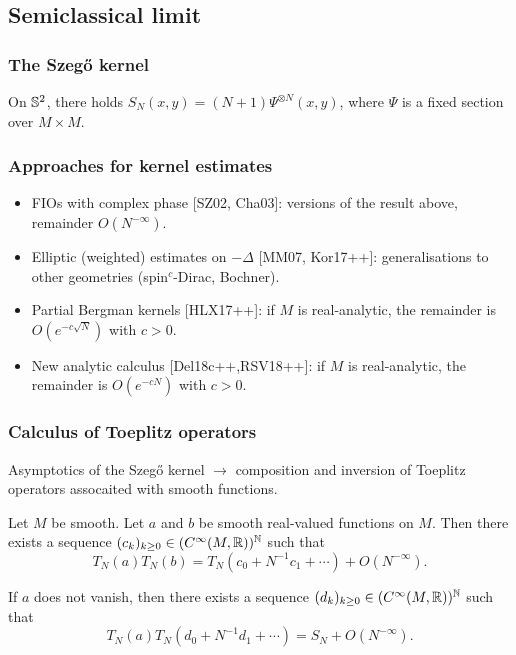 \documentclass[mathserif]{beamer}
\begin{document}
\subsection{Semiclassical limit}
\begin{frame}
  \frametitle{The Szeg\H{o} kernel}
 On $\S^2$, there holds $S_N(x,y)=(N+1)\Psi^{\otimes
      N}(x,y)$, where $\Psi$ is a fixed section over $M\times M$.
    
\end{frame}


\begin{frame}
  \frametitle{Approaches for kernel estimates}
    \begin{itemize}
    \item FIOs with complex phase [SZ02, Cha03]: versions of
      the result above, remainder $O(N^{-\infty})$.
    \item Elliptic (weighted) estimates on $-\Delta$ [MM07, Kor17++]:
      generalisations to other geometries (spin$^c$-Dirac, Bochner).
    \item Partial Bergman kernels [HLX17++]: if $M$ is {\color{myorange}
        real-analytic}, the remainder is $O(e^{-c\sqrt{N}})$ with
      $c>0$.
    \item New analytic calculus [Del18c++,RSV18++]: if $M$ is
      {\color{myorange} real-analytic},
      the remainder is $O(e^{-cN})$ with $c>0$.
    \end{itemize}
  \end{frame}

  \begin{frame}
    \frametitle{Calculus of Toeplitz operators}
    Asymptotics of the Szeg\H{o} kernel $\rightarrow$ composition and
    inversion of Toeplitz operators assocaited with smooth
    functions.

    \begin{theorem}[{[Cha03]}]Let $M$ be smooth. Let $a$ and $b$ be
      smooth real-valued functions on $M$. Then there exists a sequence $(c_k)_{k\geq
        0}\in (C^{\infty}(M,\R))^{\N}$ such that
      \[
        T_N(a)T_N(b)=T_N(c_0+N^{-1}c_1+\cdots)+O(N^{-\infty}).
        \]

        If $a$ does not vanish, then there exists a sequence
        $(d_k)_{k\geq 0}\in (C^{\infty}(M,\R))^{\N}$ such that
        \[
          T_N(a)T_N(d_0+N^{-1}d_1+\cdots)=S_N+O(N^{-\infty}).
          \]
    \end{theorem}
  \end{frame}
\end{document}
